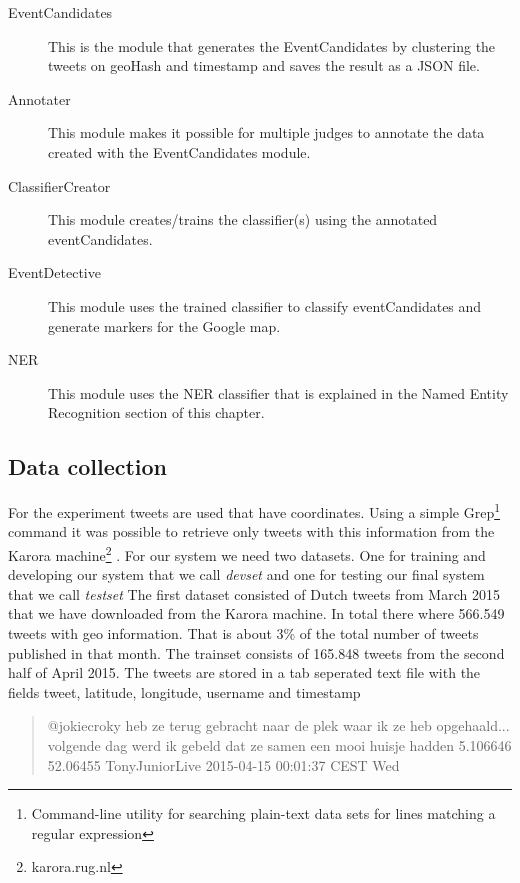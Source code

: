 \documentclass[
10pt, %
a4paper, %
oneside, %
headinclude,footinclude, %
BCOR5mm, %
]{scrartcl}
\begin{document}
\begin{description}

\item[EventCandidates] 
This is the module that generates the EventCandidates by clustering the tweets on geoHash and timestamp and saves the result as a JSON file.  

\item[Annotater] 
This module makes it possible for multiple judges to annotate the data created with the EventCandidates module. 

\item[ClassifierCreator] 
This module creates/trains the classifier(s) using the annotated eventCandidates.

\item[EventDetective] 
This module uses the trained classifier to classify eventCandidates and generate markers for the Google map.

\item[NER]
This module uses the NER classifier that is explained in the Named Entity Recognition section of this chapter.  

\end{description}

\subsection{Data collection}
For the experiment tweets are used that have coordinates. Using a simple Grep\footnote{Command-line utility for searching plain-text data sets for lines matching a regular expression } command it was possible to retrieve only tweets with this information from the Karora machine\footnote{karora.rug.nl} . For our system we need two datasets. One for training and developing our system that we call \textit{devset} and one for testing our final system that we call \textit{testset}
The first dataset consisted of Dutch tweets from March 2015 that we have downloaded from the Karora machine. In total there where 566.549 tweets with geo information. That is about 3\% of the total number of tweets published in that month. The trainset consists of 165.848 tweets from the second half of April 2015. The tweets are stored in a tab seperated text file with the fields tweet, latitude, longitude, username and timestamp
\begin{quote}
@jokiecroky heb ze terug gebracht naar de plek waar ik ze heb opgehaald... volgende dag werd ik gebeld dat ze samen een mooi huisje hadden	5.106646 52.06455	TonyJuniorLive	2015-04-15 00:01:37 CEST Wed
\end{quote}
\end{document}
